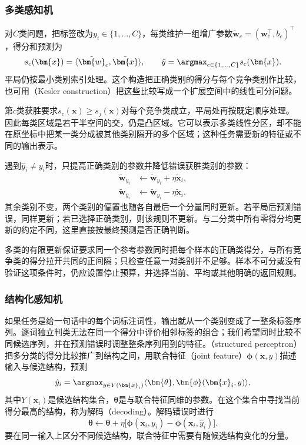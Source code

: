 \subsubsection{多类感知机}

\label{sec:classification-perceptron-multiclass}

对$C$类问题，把标签改为$y_i\in\{1,\ldots,C\}$，每类维护一组增广参数$\tilde{\bm{w}}_c=(\bm{w}_c^{\top},b_c)^{\top}$，得分和预测为
\[
  s_c(\bm{x})=\langle\tilde{\bm{w}}_c,\tilde{\bm{x}}\rangle,
  \qquad
  \hat y=\argmax_{c\in\{1,\ldots,C\}}s_c(\bm{x}).
\]
平局仍按最小类别索引处理。这个构造把正确类别的得分与每个竞争类别作比较，也可用（Kesler construction）把这些比较写成一个扩展空间中的线性可分问题。

第$c$类获胜要求$s_c(\bm x)\geq s_j(\bm x)$对每个竞争类成立，平局处再按既定顺序处理。因此每类区域是若干半空间的交，仍是凸区域。它可以表示多类线性分区，却不能在原坐标中把某一类分成被其他类别隔开的多个区域；这种任务需要新的特征或不同的输出表示。

遇到$\hat y_i\ne y_i$时，只提高正确类别的参数并降低错误获胜类别的参数：
\begin{equation}
  \label{eq:classification-perceptron-multiclass-update}
  \begin{aligned}
    \tilde{\bm{w}}_{y_i}
      &\leftarrow\tilde{\bm{w}}_{y_i}+\eta\tilde{\bm{x}}_i,\\
    \tilde{\bm{w}}_{\hat y_i}
      &\leftarrow\tilde{\bm{w}}_{\hat y_i}-\eta\tilde{\bm{x}}_i .
  \end{aligned}
\end{equation}
其余类别不变，两个类别的偏置也随各自最后一个分量同时更新。若平局后预测错误，同样更新；若已选择正确类别，则该规则不更新。与二分类中所有零得分均更新的约定不同，这里直接按最终预测是否正确判断。

多类的有限更新保证要求同一个参考参数同时把每个样本的正确类得分，与所有竞争类的得分拉开共同的正间隔；只检查任意一对类别并不足够。样本不可分或没有验证这项条件时，仍应设置停止预算，并选择当前、平均或其他明确的返回规则。

\subsubsection{结构化感知机}

如果任务是给一句话中的每个词标注词性，输出就从一个类别变成了一整条标签序列。逐词独立判类无法在同一个得分中评价相邻标签的组合；我们希望同时比较不同候选序列，并在预测错误时调整整条序列用到的特征。（structured perceptron）把多分类的得分比较推广到结构之间，用联合特征（joint feature）$\bm{\phi}(\bm{x},y)$描述输入与候选结构，预测
\[
  \hat y_i=\argmax_{y\in Y(\bm{x}_i)}
    \langle\bm{\theta},\bm{\phi}(\bm{x}_i,y)\rangle ,
\]
其中$Y(\bm{x}_i)$是候选结构集合，$\bm{\theta}$是与联合特征同维的参数。在这个集合中寻找当前得分最高的结构，称为解码（decoding）。解码错误时进行
\[
  \bm{\theta}\leftarrow\bm{\theta}
    +\eta\bigl[\bm{\phi}(\bm{x}_i,y_i)
      -\bm{\phi}(\bm{x}_i,\hat y_i)\bigr].
\]
要在同一输入上区分不同候选结构，联合特征中需要有随候选结构变化的分量。

